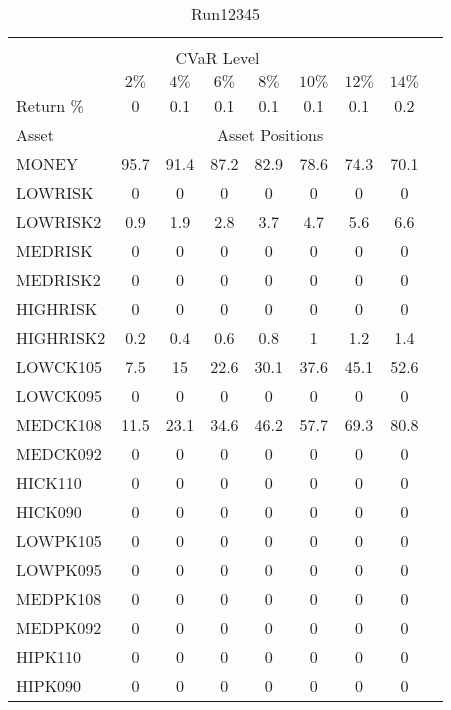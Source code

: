 \begin{table}[h!t]
\caption{Run12345}
\centering
\begin{tabular}[t]{ l c c c c c c c c }
\hline\hline \\
\multicolumn{8}{c}{CVaR Level} \\
 & $2\%$ & $4\%$ & $6\%$ & $8\%$ & $10\%$ & $12\%$ & $14\%$ \\[0.5ex]
Return \% &0 &0.1 &0.1 &0.1 &0.1 &0.1 &0.2\\[0.5ex]
Asset & \multicolumn{7}{c}{Asset Positions} \\[1ex]
MONEY & 95.7 & 91.4 & 87.2 & 82.9 & 78.6 & 74.3 & 70.1\\
LOWRISK & 0 & 0 & 0 & 0 & 0 & 0 & 0\\
LOWRISK2 & 0.9 & 1.9 & 2.8 & 3.7 & 4.7 & 5.6 & 6.6\\
MEDRISK & 0 & 0 & 0 & 0 & 0 & 0 & 0\\
MEDRISK2 & 0 & 0 & 0 & 0 & 0 & 0 & 0\\
HIGHRISK & 0 & 0 & 0 & 0 & 0 & 0 & 0\\
HIGHRISK2 & 0.2 & 0.4 & 0.6 & 0.8 & 1 & 1.2 & 1.4\\
LOWCK105 & 7.5 & 15 & 22.6 & 30.1 & 37.6 & 45.1 & 52.6\\
LOWCK095 & 0 & 0 & 0 & 0 & 0 & 0 & 0\\
MEDCK108 & 11.5 & 23.1 & 34.6 & 46.2 & 57.7 & 69.3 & 80.8\\
MEDCK092 & 0 & 0 & 0 & 0 & 0 & 0 & 0\\
HICK110 & 0 & 0 & 0 & 0 & 0 & 0 & 0\\
HICK090 & 0 & 0 & 0 & 0 & 0 & 0 & 0\\
LOWPK105 & 0 & 0 & 0 & 0 & 0 & 0 & 0\\
LOWPK095 & 0 & 0 & 0 & 0 & 0 & 0 & 0\\
MEDPK108 & 0 & 0 & 0 & 0 & 0 & 0 & 0\\
MEDPK092 & 0 & 0 & 0 & 0 & 0 & 0 & 0\\
HIPK110 & 0 & 0 & 0 & 0 & 0 & 0 & 0\\
HIPK090 & 0 & 0 & 0 & 0 & 0 & 0 & 0\\
[1ex] \hline
\end{tabular}
\end{table} 